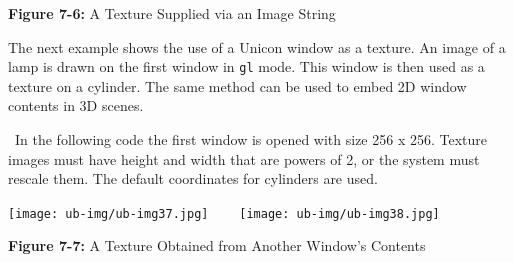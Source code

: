 {\sffamily\bfseries Figure 7-6:}
{\sffamily A Texture Supplied via an Image String}

\bigskip


The next example shows the use of a Unicon window as a texture. An
image of a lamp is drawn on the first window in \texttt{gl} mode. This
window is then used as a texture on a cylinder. The same method can be
used to embed 2D window contents in 3D scenes.

\medskip{}\ {\sffamily In the
following code the first window is opened with size 256 x 256. Texture
images must have height and width that are powers of 2, or the system
must rescale them. The default coordinates for cylinders are used.}\medskip

{\centering\color{green}
 \texttt{[image: ub-img/ub-img37.jpg]}
\texttt{ \ \ }
\texttt{[image: ub-img/ub-img38.jpg]}
\texttt{ \ \ }
\par}

{\sffamily\bfseries Figure 7-7:}
{\sffamily A Texture Obtained from Another Window's Contents}

\bigskip

